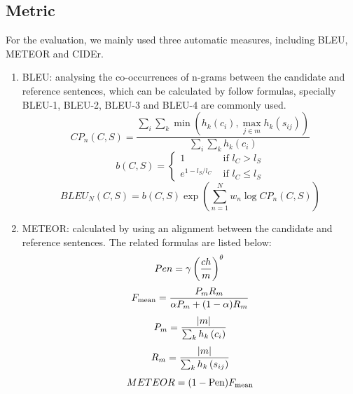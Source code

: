 \documentclass{article}
\begin{document}
\subsection{Metric}
For the evaluation, we mainly used three automatic measures, including BLEU, METEOR and CIDEr.
\begin{enumerate}
\item BLEU\cite{papineni2002bleu}: analysing the co-occurrences of n-grams between the candidate and reference sentences, which can be calculated by follow formulas, specially BLEU-1, BLEU-2, BLEU-3 and BLEU-4 are commonly used.
\begin{equation}
C P_{n}(C, S)=\frac{\sum_{i} \sum_{k} \min \left(h_{k}\left(c_{i}\right), \max _{j \in m} h_{k}\left(s_{i j}\right)\right)}{\sum_{i} \sum_{k} h_{k}\left(c_{i}\right)}
\end{equation}
\begin{equation}
b(C, S)=\left\{\begin{array}{ll}
1 & \text { if } l_{C}>l_{S} \\
e^{1-l_{S} / l_{C}} & \text { if } l_{C} \leq l_{S}
\end{array}\right.
\end{equation}
\begin{equation}
BLEU_{N}(C, S)=b(C, S) \exp \left(\sum_{n=1}^{N} w_{n} \log C P_{n}(C, S)\right)   
\end{equation}

\item METEOR\cite{denkowski2014meteor}: calculated by using an alignment between the candidate and reference sentences. The related formulas are listed below:
\begin{equation}
Pen=\gamma\left(\frac{c h}{m}\right)^{\theta} \\
\end{equation}
\begin{equation}
F_{\text {mean}}=\frac{P_{m} R_{m}}{\alpha P_{m}+(1-\alpha) R_{m}} \\
\end{equation}
\begin{equation}
P_{m}=\frac{|m|}{\sum_{k} h_{k}\left(c_{i}\right)} \\
\end{equation}
\begin{equation}
R_{m}=\frac{|m|}{\sum_{k} h_{k}\left(s_{i j}\right)} \\
\end{equation}
\begin{equation}
METEOR=(1-\text {Pen}) F_{\text {mean}} \\
\end{equation}


\end{enumerate}
\end{document}
